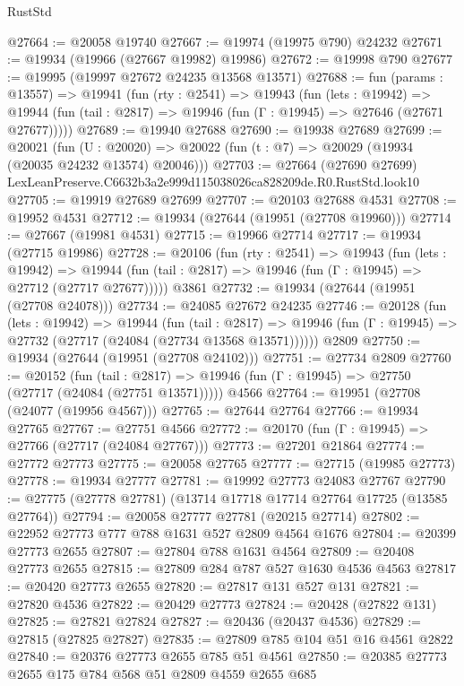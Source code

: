 \begin{lexlean}{RustStd}
\begin{coremodule}
@27664 := @20058 @19740
@27667 := @19974 (@19975 @790) @24232
@27671 := @19934 (@19966 (@27667 @19982) @19986)
@27672 := @19998 @790
@27677 := @19995 (@19997 @27672 @24235 @13568 @13571)
@27688 := fun (params : @13557) =>
  @19941
    (fun (rty : @2541) =>
    @19943
      (fun (lets : @19942) =>
      @19944 (fun (tail : @2817) => @19946 (fun (Γ : @19945) => @27646 (@27671 @27677)))))
@27689 := @19940 @27688
@27690 := @19938 @27689
@27699 := @20021
    (fun (U : @20020) => @20022 (fun (t : @7) => @20029 (@19934 (@20035 @24232 @13574) @20046)))
@27703 := @27664 (@27690 @27699) LexLeanPreserve.C6632b3a2e999d115038026ca828209de.R0.RustStd.look10
@27705 := @19919 @27689 @27699
@27707 := @20103 @27688 @4531
@27708 := @19952 @4531
@27712 := @19934 (@27644 (@19951 (@27708 @19960)))
@27714 := @27667 (@19981 @4531)
@27715 := @19966 @27714
@27717 := @19934 (@27715 @19986)
@27728 := @20106
    (fun (rty : @2541) =>
    @19943
      (fun (lets : @19942) =>
      @19944 (fun (tail : @2817) => @19946 (fun (Γ : @19945) => @27712 (@27717 @27677)))))
    @3861
@27732 := @19934 (@27644 (@19951 (@27708 @24078)))
@27734 := @24085 @27672 @24235
@27746 := @20128
    (fun (lets : @19942) =>
    @19944
      (fun (tail : @2817) =>
      @19946 (fun (Γ : @19945) => @27732 (@27717 (@24084 (@27734 @13568 @13571))))))
    @2809
@27750 := @19934 (@27644 (@19951 (@27708 @24102)))
@27751 := @27734 @2809
@27760 := @20152
    (fun (tail : @2817) => @19946 (fun (Γ : @19945) => @27750 (@27717 (@24084 (@27751 @13571)))))
    @4566
@27764 := @19951 (@27708 (@24077 (@19956 @4567)))
@27765 := @27644 @27764
@27766 := @19934 @27765
@27767 := @27751 @4566
@27772 := @20170 (fun (Γ : @19945) => @27766 (@27717 (@24084 @27767)))
@27773 := @27201 @21864
@27774 := @27772 @27773
@27775 := @20058 @27765
@27777 := @27715 (@19985 @27773)
@27778 := @19934 @27777
@27781 := @19992 @27773 @24083 @27767
@27790 := @27775 (@27778 @27781) (@13714 @17718 @17714 @27764 @17725 (@13585 @27764))
@27794 := @20058 @27777 @27781 (@20215 @27714)
@27802 := @22952 @27773 @777 @788 @1631 @527 @2809 @4564 @1676
@27804 := @20399 @27773 @2655
@27807 := @27804 @788 @1631 @4564
@27809 := @20408 @27773 @2655
@27815 := @27809 @284 @787 @527 @1630 @4536 @4563
@27817 := @20420 @27773 @2655
@27820 := @27817 @131 @527 @131
@27821 := @27820 @4536
@27822 := @20429 @27773
@27824 := @20428 (@27822 @131)
@27825 := @27821 @27824
@27827 := @20436 (@20437 @4536)
@27829 := @27815 (@27825 @27827)
@27835 := @27809 @785 @104 @51 @16 @4561 @2822
@27840 := @20376 @27773 @2655 @785 @51 @4561
@27850 := @20385 @27773 @2655 @175 @784 @568 @51 @2809 @4559 @2655 @685

\end{coremodule}
\end{lexlean}
